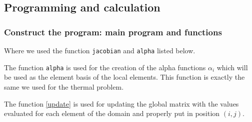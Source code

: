 \subsection{Programming and calculation}
\subsubsection{Construct the program: main program and functions}


Where we used the function \texttt{jacobian} and \texttt{alpha} listed below.



The function \texttt{alpha} is used for the creation of the alpha functions $ \alpha_i $ which will be used as the element basis of the local elements. This function is exactly the same we used for the thermal problem.


The function \ref{update} is used for updating the global matrix with the values evaluated for each element of the domain and properly put in position $ (i,j) $. 





